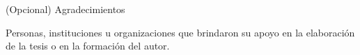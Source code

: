 \begin{center}

\normalsize (Opcional) Agradecimientos

\end{center}

\vspace{3mm}

\normalsize Personas, instituciones u organizaciones que brindaron su apoyo en la elaboración de la tesis o en la formación del autor.

\newpage